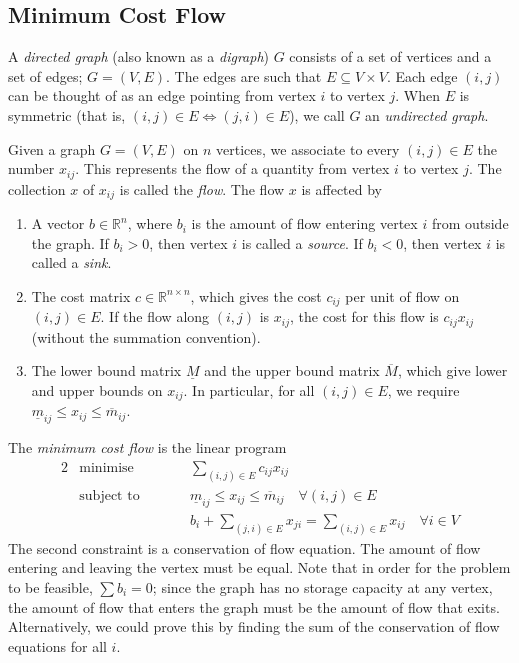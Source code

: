 \subsection{Minimum Cost Flow}
\begin{definition}
    A \textit{directed graph} (also known as a \textit{digraph}) \( G \) consists of a set of vertices and a set of edges; \( G = (V, E) \).
    The edges are such that \( E \subseteq V \times V \).
    Each edge \( (i,j) \) can be thought of as an edge pointing from vertex \( i \) to vertex \( j \).
    When \( E \) is symmetric (that is, \( (i,j) \in E \iff (j,i) \in E \)), we call \( G \) an \textit{undirected graph}.
\end{definition}
\begin{definition}
    Given a graph \( G = (V, E) \) on \( n \) vertices, we associate to every \( (i,j) \in E \) the number \( x_{ij} \).
    This represents the flow of a quantity from vertex \( i \) to vertex \( j \).
    The collection \( x \) of \( x_{ij} \) is called the \textit{flow}.
    The flow \( x \) is affected by
    \begin{enumerate}
        \item A vector \( b \in \mathbb R^n \), where \( b_i \) is the amount of flow entering vertex \( i \) from outside the graph.
        If \( b_i > 0 \), then vertex \( i \) is called a \textit{source}.
        If \( b_i < 0 \), then vertex \( i \) is called a \textit{sink}.
        \item The cost matrix \( c \in \mathbb R^{n \times n} \), which gives the cost \( c_{ij} \) per unit of flow on \( (i,j) \in E \).
        If the flow along \( (i,j) \) is \( x_{ij} \), the cost for this flow is \( c_{ij}x_{ij} \) (without the summation convention).
        \item The lower bound matrix \( \underline{M} \) and the upper bound matrix \( \overline{M} \), which give lower and upper bounds on \( x_{ij} \).
        In particular, for all \( (i,j) \in E \), we require \( \underline m_{ij} \leq x_{ij} \leq \overline m_{ij} \).
    \end{enumerate}
\end{definition}
\begin{definition}
    The \textit{minimum cost flow} is the linear program
    \begin{alignat*}{2}
        & \text{minimise} & \qquad & \sum_{(i,j) \in E}c_{ij}x_{ij}            \\
        & \text{subject to}                                &        & \underline m_{ij} \leq x_{ij} \leq \overline m_{ij} \quad \forall (i,j) \in E \\
        & & & b_i + \sum_{(j,i) \in E} x_{ji} = \sum_{(i,j)\in E} x_{ij} \quad \forall i \in V
    \end{alignat*}
    The second constraint is a conservation of flow equation.
    The amount of flow entering and leaving the vertex must be equal.
    Note that in order for the problem to be feasible, \( \sum b_i = 0 \); since the graph has no storage capacity at any vertex, the amount of flow that enters the graph must be the amount of flow that exits.
    Alternatively, we could prove this by finding the sum of the conservation of flow equations for all \( i \).
\end{definition}
